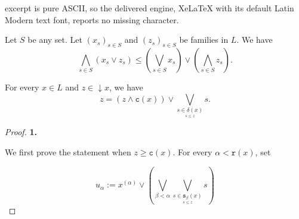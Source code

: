 \documentclass[10pt,a4paper]{amsart}
\begin{document}
excerpt is pure ASCII, so the delivered engine, XeLaTeX with its default Latin Modern text font, reports no missing character.
\begin{lemma}\label{lemma.minmax}
Let \(S\) be any set. Let \((x_s)_{s \in S}\) and \((z_s)_{s \in S}\) be families in \(L\). We have 
\[\bigwedge_{s \in S} (x_s \vee z_s) \leq(\bigvee_{s \in S} x_s)\vee(\bigwedge_{s \in S} z_s).\]
\end{lemma}

\begin{lemma}\label{lemma.subelement.decomposition}
    For every $x \in L$ and $ z \in \mathop{\downarrow}x$, we have 
    \[z = (z \wedge \texttt{c}(x)) \vee \bigvee_{\underset{s \le z}{s \in \delta(x)}} s.\]
\end{lemma}

\begin{proof}
    \textbf{1.} 
    {We first prove the statement when \(z\ge \texttt{c}(x)\). For every \(\alpha<\texttt r(x)\), set

\[u_{\alpha} := x^{(\alpha)}\vee \left(\bigvee_{\beta < \alpha} \bigvee_{\underset{s \le z}{s \in \texttt{s}_{\beta}(x)}}s\right)\]

}
\end{proof}
\end{document}
